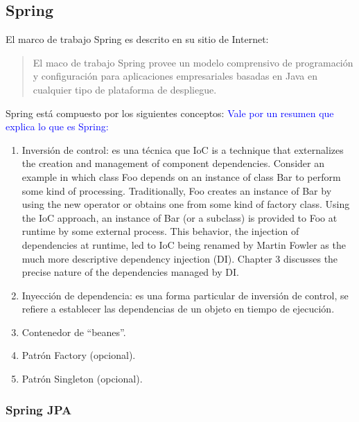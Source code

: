 \subsection{Spring}\label{sec-spring}

El marco de trabajo Spring es descrito en su sitio de Internet\cite{SpringFramework}:
\begin{quote}
	El maco de trabajo Spring provee un modelo comprensivo de programación y configuración para aplicaciones empresariales basadas en Java en cualquier tipo de plataforma de despliegue.
\end{quote}

Spring está compuesto por los siguientes conceptos:
\textcolor{blue}{Vale por un resumen que explica lo que es Spring:}
\begin{enumerate}
	\item Inversión de control: es una técnica que 
IoC is a technique that externalizes the creation and management of component dependencies. Consider an example in which class Foo depends on an instance of class Bar to perform some kind of processing. Traditionally, Foo creates an instance of Bar by using the new operator or obtains one from some kind of factory class. Using the IoC approach, an instance of Bar (or a subclass) is provided to Foo at runtime by some external process. This behavior, the injection of dependencies at runtime, led to IoC being renamed by Martin Fowler as the much more descriptive dependency injection (DI). Chapter 3 discusses the precise nature of the dependencies managed by DI.
\cite{ProSpring5}
	\item Inyección de dependencia: es una forma particular de inversión de control, se refiere a establecer las dependencias de un objeto en tiempo de ejecución.\cite{WellGroundedJavaDeveloper}

	\item Contenedor de ``beanes''.

	\item Patrón Factory (opcional).
	\item Patrón Singleton (opcional).
\end{enumerate}


\subsubsection{Spring JPA}\label{sec-spring-jpa}


